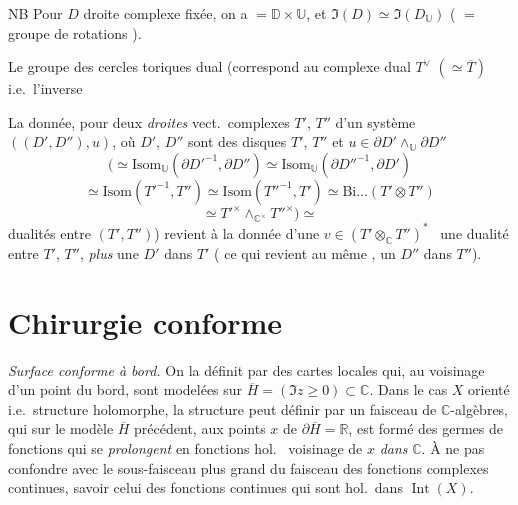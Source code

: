 \documentclass[11pt,a4paper]{article}
\begin{document}
NB Pour $D$ droite complexe fixée, on a  $= \mathbb{D} \times \mathbb{U}$, et $\mathfrak{I}(D) \simeq \mathfrak{I}(D_{\mathbb{U}})$ ( $=$ groupe de rotations ).

Le groupe des cercles toriques  dual (correspond au  complexe dual \struck{\ill{}} $T^{\vee}$  $(\simeq \overline{T})$ i.e.\ l'inverse  \struck{\ill{}}

La donnée, pour deux \emph{droites} vect.\ complexes $T'$, $T''$ d'un système $((D', D''), u)$, où $D'$, $D''$ sont des disques  $T'$, $T''$ et $u \in \partial D' \wedge_{\mathbb{U}} \partial D''$
\[
  \bigl(\simeq \mathrm{Isom}_{\mathbb{U}}(\partial D'^{-1}, \partial D'') \simeq \mathrm{Isom}_{\mathbb{U}}(\partial D''^{-1}, \partial D')
\]
\[
  \simeq \mathrm{Isom}(T'^{-1}, T'') \simeq \mathrm{Isom}(T''^{-1}, T') \simeq \mathrm{Bi}\ldots(T' \otimes T'')
\]
\[
  \simeq T'^{\times} \wedge_{\mathbb{C}^{\times}} T''^{\times} \bigr) \simeq
\]
\struck{\ill{}} dualités entre $(T', T'')$)
revient à la donnée d'une $v \in (T' \otimes_{\mathbb{C}} T'')^{*}$ \ une dualité entre $T'$, $T''$, \emph{plus} une \uncertain{\ill{}} $D'$ dans $T'$ (\ill{} ce qui revient au même \ill{},  un  $D''$ dans $T''$).

\section*{Chirurgie conforme}

 \emph{Surface conforme à bord.} On  la définit par des cartes locales qui, au voisinage d'un point du bord, sont modelées sur $\overline{H} = (\Im z \geq 0) \subset \mathbb{C}$. Dans le cas $X$ orienté i.e.\ structure holomorphe, la structure peut  définir par un faisceau de $\mathbb{C}$-algèbres, qui sur le modèle $\overline{H}$ précédent, aux points $x$ de $\partial \overline{H} = \mathbb{R}$, est formé des germes de fonctions qui se \emph{prolongent} en fonctions hol.\   voisinage de $x$ \emph{dans} $\mathbb{C}$. À ne pas confondre avec le sous-faisceau plus grand du faisceau des fonctions complexes continues, savoir  celui des fonctions continues qui sont hol.\ dans $\operatorname{Int}(X)$.
\end{document}
